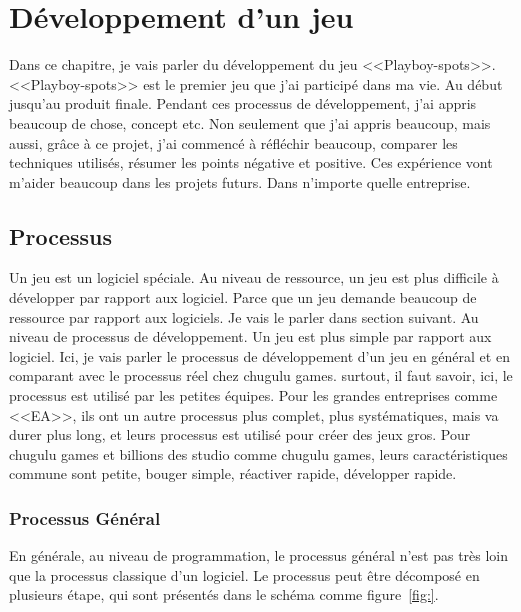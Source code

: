 \chapter{Développement d'un jeu} %
\label{cha:développement_d_un_jeu}

Dans ce chapitre, je vais parler du développement du jeu <<Playboy-spots>>. <<Playboy-spots>> est le premier jeu que j'ai participé dans ma vie. Au début jusqu'au produit finale. Pendant ces processus de développement, j'ai appris beaucoup de chose, concept etc. Non seulement que j'ai appris beaucoup, mais aussi, grâce à ce projet, j'ai commencé à réfléchir beaucoup, comparer les techniques utilisés, résumer les points négative et positive. Ces expérience vont m'aider beaucoup dans les projets futurs. Dans n'importe quelle entreprise.

\section{Processus} %
\label{sec:processus}

Un jeu est un logiciel spéciale. Au niveau de ressource, un jeu est plus difficile à développer par rapport aux logiciel. Parce que un jeu demande beaucoup de ressource par rapport aux logiciels. Je vais le parler dans section suivant. Au niveau de processus de développement. Un jeu est plus simple par rapport aux logiciel. Ici, je vais parler le processus de développement d'un jeu en général et en comparant avec le processus réel chez chugulu games. surtout, il faut savoir, ici, le processus est utilisé par les petites équipes. Pour les grandes entreprises comme <<EA>>, ils ont un autre processus plus complet, plus systématiques, mais va durer plus long, et leurs processus est utilisé pour créer des jeux gros. Pour chugulu games et billions des studio comme chugulu games, leurs caractéristiques commune sont petite, bouger simple, réactiver rapide, développer rapide. 

\subsection{Processus Général} %
\label{sub:processus_général}

En générale, au niveau de programmation, le processus général n'est pas très loin que la processus classique d'un logiciel. Le processus peut être décomposé en plusieurs étape, qui sont présentés dans le schéma comme figure~\ref{fig:}.


